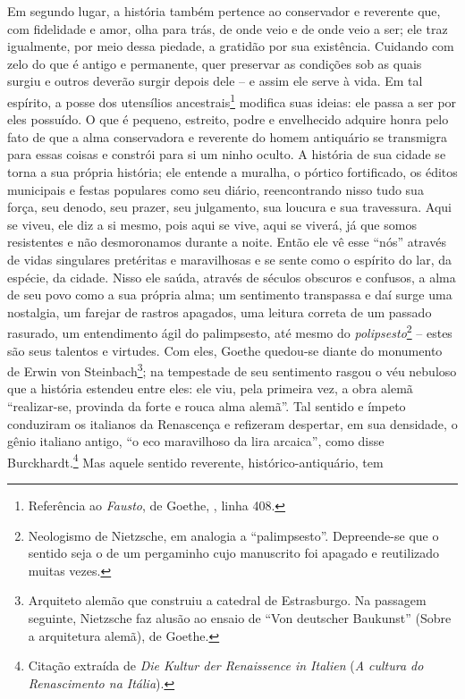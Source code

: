 Em segundo lugar, a história também pertence ao conservador e reverente que, 
com fidelidade e amor, olha para trás, de onde veio e de
onde veio a ser; ele traz igualmente, por meio dessa piedade, a gratidão
por sua existência. Cuidando com zelo do que é antigo e permanente, quer preservar
 as condições sob as quais surgiu e outros deverão
surgir depois dele -- e assim ele serve à vida. Em tal espírito, a posse
dos utensílios ancestrais\footnote{Referência ao \emph{Fausto}, de
  Goethe, , linha 408.} modifica suas ideias: ele passa a ser por eles
possuído. O que é pequeno, estreito, podre e envelhecido adquire honra
pelo fato de que a alma conservadora e reverente do homem antiquário se
transmigra para essas coisas e constrói para si um ninho oculto. A
história de sua cidade se torna a sua própria história; ele entende a
muralha, o pórtico fortificado, os éditos municipais e festas populares
como seu diário, reencontrando nisso tudo sua força, seu denodo, seu
prazer, seu julgamento, sua loucura e sua travessura. Aqui se viveu, ele
diz a si mesmo, pois aqui se vive, aqui se viverá, já que somos
resistentes e não desmoronamos durante a noite. Então ele vê esse
``nós'' através de vidas singulares pretéritas e maravilhosas e se sente
como o espírito do lar, da espécie, da cidade. Nisso ele saúda, através
de séculos obscuros e confusos, a alma de seu povo como a sua própria
alma; um sentimento transpassa e daí surge uma nostalgia, um farejar de
rastros apagados, uma leitura correta de um passado rasurado, um
entendimento ágil do palimpsesto, até mesmo do \emph{polipsesto}\footnote{Neologismo
  de Nietzsche, em analogia a ``palimpsesto''. Depreende-se que o
  sentido seja o de um pergaminho cujo manuscrito foi apagado e
  reutilizado muitas vezes.} -- estes são seus talentos e virtudes. Com
eles, Goethe quedou-se diante do monumento de Erwin von
Steinbach\footnote{Arquiteto alemão que construiu a catedral de
  Estrasburgo. Na passagem seguinte, Nietzsche faz alusão ao ensaio de
  ``Von deutscher Baukunst'' (Sobre a arquitetura alemã), de Goethe.};
na tempestade de seu sentimento rasgou o véu nebuloso que a história
estendeu entre eles: ele viu, pela primeira vez, a obra alemã
``realizar-se, provinda da forte e rouca alma alemã''. Tal sentido e
ímpeto conduziram os italianos da Renascença e refizeram despertar, em
sua densidade, o gênio italiano antigo, ``o eco maravilhoso da lira
arcaica'', como disse Burckhardt.\footnote{Citação extraída de \emph{Die
  Kultur der Renaissence in Italien} (\emph{A cultura do Renascimento na
  Itália}).} Mas aquele sentido reverente, histórico-antiquário, tem
